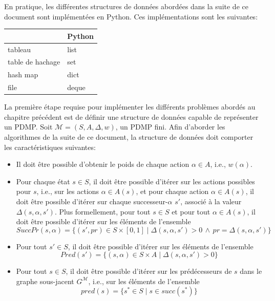 \documentclass[12pt,a4paper]{report}
\theoremstyle{definition}%
\theoremstyle{remark}
\let\labelitemi\labelitemii
\begin{document}
En pratique, les différentes structures de données abordées dans la suite de
ce document sont implémentées en Python. Ces implémentations sont les
suivantes:
\begin{table}[H]
\centering
\begin{tabular}{l|l}
                 & Python \\ \hline
tableau          & list   \\
table de hachage & set    \\
hash map				 & dict		\\
file             & deque
\end{tabular}
\end{table}


La première étape requise pour implémenter les différents problèmes abordés au
chapitre précédent est de définir une structure de données capable de représenter
un PDMP. Soit $\mathcal{M} = (S, A, \Delta, w)$, un PDMP fini. Afin d'aborder les algorithmes de la suite de ce document, la structure
de données doit comporter les caractéristiques suivantes:
\begin{itemize}
	\renewcommand{\labelitemi}{\tiny$\bullet$}
	\item Il doit être possible d'obtenir le poids de chaque
		action $\alpha \in A$, i.e., $w(\alpha)$.
	\item Pour chaque état $s \in S$, il doit être possible d'itérer sur les actions
		possibles pour $s$, i.e., sur les actions $\alpha \in A(s)$, et pour
		chaque action $\alpha \in A(s)$, il doit être possible d'itérer sur chaque
		successeur-$\alpha$ $s'$, associé à la valeur $\Delta(s, \alpha, s')$. Plus
		formellement, pour tout $s \in S$ et pour tout $\alpha \in A(s)$, il doit être possible d'itérer
		sur les éléments de l'ensemble
		\[
			SuccPr(s, \alpha) =
			\{
				(s', pr) \in S \times [0, 1] \; | \; \Delta(s, \alpha, s') > 0 \, \wedge
				\, pr = \Delta(s, \alpha, s')
			\}
		\]
	\item Pour tout $s' \in S$, il doit être possible d'itérer sur les éléments de l'ensemble
		\[
			Pred(s') =
			\{ (s, \alpha) \in S \times A \; | \; \Delta(s, \alpha, s') > 0 \}
		\]
	\item Pour tout $s \in S$, il doit être possible d'itérer sur les
		prédécesseurs de $s$ dans le graphe sous-jacent $G^\mathcal{M}$, i.e., sur les éléments de l'ensemble
		\[
			pred(s) = \{ s^* \in S \; | \; s \in succ(s^*) \}
		\]
\end{itemize}
\end{document}
